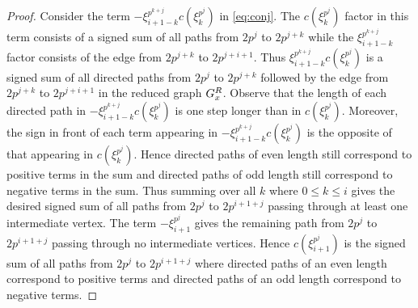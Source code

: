 \documentclass[10pt,a4paper]{amsart}
\begin{document}
\begin{proof}
Consider the term $- \xi_{i + 1 - k}^{p^{k + j}} c(\xi_k^{p^j})$ in \cref{eq:conj}. The $c(\xi_k^{p^j})$ factor in this term consists of a signed sum of all paths from $2 p^j$ to $2 p^{j + k}$ while the $\xi_{i + 1 - k}^{p^{k + j}}$ factor consists of the edge from $2 p^{j + k}$ to $2 p^{j + i +1}$. Thus $\xi_{i + 1 - k}^{p^{k + j}} c(\xi_k^{p^j})$ is a signed sum of all directed paths from $2 p^j$ to $2 p^{j + k}$ followed by the edge from $2 p^{j + k}$ to $2 p^{j + i +1}$ in the reduced graph $G_x^\textup{R}$. Observe that the length of each directed path in $-\xi_{i + 1 - k}^{p^{k + j}} c(\xi_k^{p^j})$ is one step longer than in $c(\xi_k^{p^j})$. Moreover, the sign in front of each term appearing in $-\xi_{i + 1 - k}^{p^{k + j}} c(\xi_k^{p^j})$ is the opposite of that appearing in $c(\xi_k^{p^j})$. Hence directed paths of even length still correspond to positive terms in the sum and directed paths of odd length still correspond to negative terms in the sum.
Thus summing over all $k$ where $0 \leq k \leq i$ gives the desired signed sum of all paths from $2 p^j$ to $2 p^{i + 1 + j}$ passing through at least one intermediate vertex. The term $-\xi_{i + 1}^{p^j}$ gives the remaining path from $2 p^j$ to $2 p^{i + 1 +j}$ passing through no intermediate vertices. Hence $c(\xi_{i + 1}^{p^j})$ is the signed sum of all paths from $2p^j$ to $2 p^{i + 1 + j}$ where directed paths of an even length correspond to positive terms and directed paths of an odd length correspond to negative terms. 


\end{proof}
\end{document}
